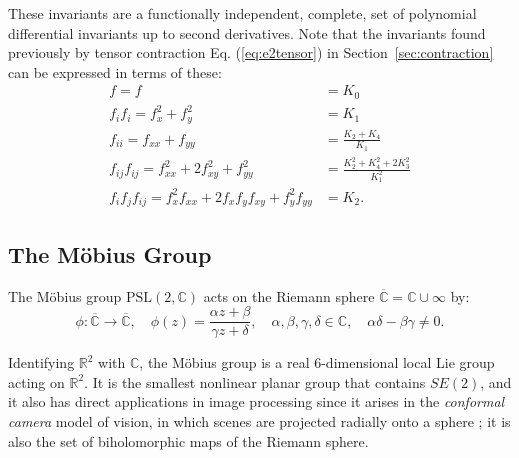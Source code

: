 \documentclass[review,onefignum,onetabnum]{siamonline190516}
\def\R{\mathbb{R}}
\begin{document}
These invariants are a functionally independent, complete, set of
polynomial differential invariants up to second derivatives. Note that the
invariants found previously by tensor contraction Eq. (\ref{eq:e2tensor}) in
Section~\ref{sec:contraction} can be expressed in terms of these:
\begin{align*}
  f = f &= K_0 \\
  f_if_i = f_x^2 + f_y^2 &= K_1 \\
  f_{ii} = f_{xx} + f_{yy} &= \frac{K_2 + K_4}{K_1} \\
  f_{ij} f_{ij} = f_{xx}^2 + 2f_{xy}^2 + f_{yy}^2 &= \frac{K_2^2 + K_4^2 + 2K_3^2}{K_1^2} \\
  f_i f_j f_{ij} = f_x^2 f_{xx} + 2f_x f_y f_{xy} + f_y^2 f_{yy} &= K_2.
\end{align*}

\subsection{The M\"{o}bius Group}

The M\"obius group $\mathrm{PSL}(2,\mathbb{C})$ acts on the Riemann sphere $\overline{\mathbb{C}} = \mathbb{C}\cup\infty$ by:
\begin{equation} 
\phi\colon \overline{\mathbb{C}} \to \overline{\mathbb{C}},\quad \phi(z) = \frac{\alpha z + \beta}{\gamma z + \delta},\quad \alpha,\beta,\gamma,\delta\in\mathbb{C}, \quad
\alpha\delta-\beta\gamma\ne 0.
\end{equation}

Identifying $\R^2$ with $\mathbb{C}$, the M\"obius group is a real 6-dimensional local Lie group acting on $\mathbb{R}^2$. 
It is the smallest nonlinear planar group that contains $SE(2)$, and it also has direct applications in image processing since it arises in the {\em conformal camera} model of vision, in which scenes are projected radially onto a sphere \cite{Lenz1990,Turski2004}; it is also the set of biholomorphic maps of the Riemann sphere. 
\end{document}
